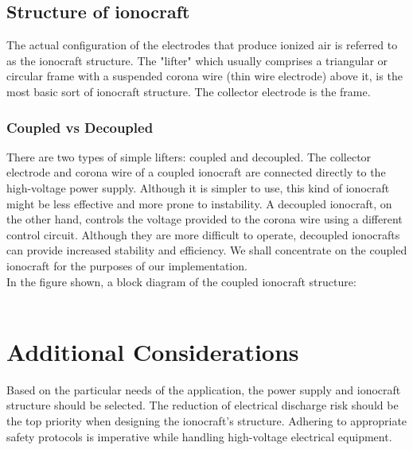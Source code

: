 \subsection*{Structure of ionocraft}
\hspace{\parindent}The actual configuration of the electrodes that produce ionized air is referred to as the ionocraft structure. The "lifter" which usually comprises a triangular or circular frame with a suspended corona wire (thin wire electrode) above it, is the most basic sort of ionocraft structure. The collector electrode is the frame.
\subsubsection*{Coupled vs Decoupled}
\hspace{\parindent}There are two types of simple lifters: coupled and decoupled. The collector electrode and corona wire of a coupled ionocraft are connected directly to the high-voltage power supply. Although it is simpler to use, this kind of ionocraft might be less effective and more prone to instability\cite{drew2018toward}. A decoupled ionocraft, on the other hand, controls the voltage provided to the corona wire using a different control circuit. Although they are more difficult to operate, decoupled ionocrafts can provide increased stability and efficiency. We shall concentrate on the coupled ionocraft for the purposes of our implementation.\\
In the figure shown, a block diagram of the coupled ionocraft structure:\\\\




\section*{Additional Considerations}
\hspace{\parindent}Based on the particular needs of the application, the power supply and ionocraft structure should be selected. The reduction of electrical discharge risk should be the top priority when designing the ionocraft's structure. Adhering to appropriate safety protocols is imperative while handling high-voltage electrical equipment.
